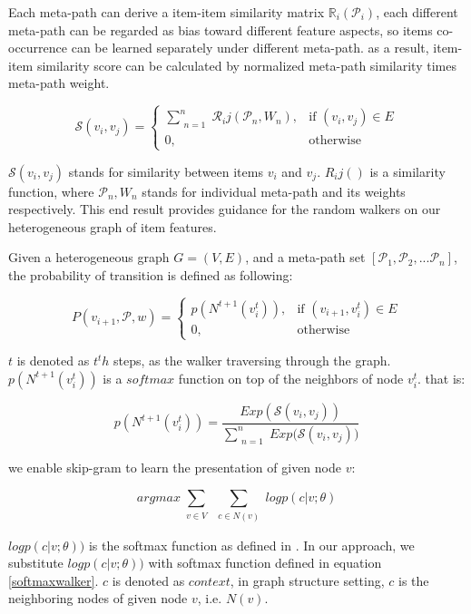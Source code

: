 Each meta-path can derive a item-item similarity matrix $\mathbb{R}_i(\mathcal{P}_i)$, each different meta-path can be regarded as bias toward different feature aspects, so items co-occurrence can be learned separately under different meta-path.
as a result, item-item similarity score can be calculated by normalized meta-path similarity times meta-path weight.

\begin{equation}\label{itemsim}
    \mathcal{S}(v_i,v_j) = 
    \begin{cases}
         \sum\limits_{\substack{n=1}}^{n} \mathcal{R}_ij(\mathcal{P}_n,{W_n}),& \text{if } (v_{i}, v_{j}) \in E \\
         0,              & \text{otherwise}
     \end{cases}
\end{equation}

$\mathcal{S}(v_i,v_j)$ stands for similarity between items $v_i$ and $v_j$. $R_ij()$ is a similarity function, where $\mathcal{P}_n, {W_n}$ stands for individual meta-path and its weights respectively. This end result provides guidance for the random walkers on our heterogeneous graph of item features. 

Given a heterogeneous graph $G = (V,E)$, and a meta-path set $[\mathcal{P}_1, \mathcal{P}_2, ... \mathcal{P}_n]$, the probability of transition is defined as following:

\begin{equation}\label{hetewalker}
    P(v_{i+1},\mathcal{P},w)= 
        \begin{cases}
            p({N^{t+1}(v_{i}^t)}),& \text{if } (v_{i+1}, v_{i}^t) \in E \\
            0,              & \text{otherwise}
        \end{cases}
\end{equation}

$t$ is denoted as $t^th$ steps, as the walker traversing through the graph.
$p({N^{t+1}(v_{i}^t)})$ is a $softmax$ function on top of the neighbors of node $v_{i}^t$. 
that is:

\begin{equation}\label{softmaxwalker}
    p({N^{t+1}(v_{i}^t)}) = \frac{Exp(\mathcal{S}(v_i,v_j))}{\sum\limits_{\substack{n=1}}^{n} {Exp(\mathcal{S}(v_i,v_j)})}
\end{equation}

we enable skip-gram to learn the presentation of given node $v$:

\begin{equation}\label{skipgram}
    arg max
    \sum\limits_{\substack{v \in V}}
    \sum\limits_{\substack{c \in N(v)}}
    log p({c|v;\theta})
\end{equation}

$log p({c|v;\theta}))$ is the softmax function as defined in \cite{mikolov2013distributed} \cite{mikolov2013efficient}. In our approach, we substitute $log p({c|v;\theta}))$ with softmax function defined in equation \ref{softmaxwalker}. $c$ is denoted as $context$, in graph structure setting, $c$ is the neighboring nodes of given node $v$, i.e. $N(v)$. 


